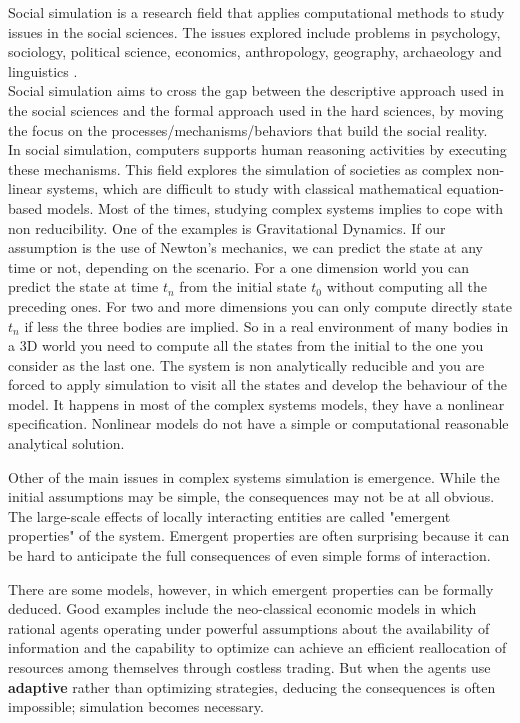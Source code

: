 \documentclass{report}
\begin{document}
Social simulation is a research field that applies computational methods to study issues in the social sciences. The issues explored include problems in psychology, sociology, political science, economics, anthropology, geography, archaeology and linguistics \cite{TakahashiSallachRouchier2007}.\\
Social simulation aims to cross the gap between the descriptive approach used in the social sciences and the formal approach used in the hard sciences, by moving the focus on the processes/mechanisms/behaviors that build the social reality.\\
In social simulation, computers supports human reasoning activities by executing these mechanisms. This field explores the simulation of societies as complex non-linear systems, which are difficult to study with classical mathematical equation-based models.
Most of the times, studying complex systems implies to cope with non reducibility. One of the examples is Gravitational Dynamics. If our assumption is the use of Newton's mechanics, we can predict the state at any time or not, depending on the scenario. For a one dimension world you can predict the state at time $t_n$ from the initial state $t_0$ without computing all the preceding ones. For two and more dimensions you can only compute directly state $t_n$ if less the three bodies are implied. So in a real environment of many bodies in a 3D world you need to compute all the states from the initial to the one you consider as the last one. The system is non analytically reducible and you are forced to apply simulation to visit all the states and develop the behaviour of the model. It happens in most of the complex systems models, they have a nonlinear specification. Nonlinear models do not have a simple or computational reasonable analytical solution. 

Other of the main issues in complex systems simulation is emergence. While the initial assumptions may be simple, the consequences may not be at all obvious. The large-scale effects of locally interacting entities are called "emergent properties" of the system. Emergent properties are often surprising because it can be hard to anticipate the full consequences of even simple forms of interaction. 

There are some models, however, in which emergent properties can be formally deduced. Good examples include the neo-classical economic models in which rational agents operating under powerful assumptions about the availability of information and the capability to optimize can achieve an efficient reallocation of resources among themselves through costless trading. But when the agents use \textbf{adaptive} rather than optimizing strategies, deducing the consequences is often impossible; simulation becomes necessary.
\end{document}
